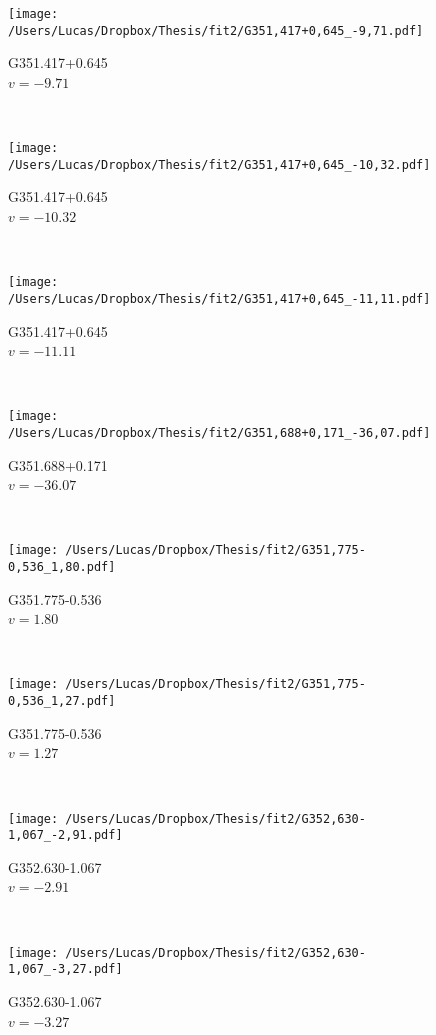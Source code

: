 \begin{figure*}[t]\ContinuedFloat
	\centering
	\begin{subfigure}[t]{0.3\textwidth}
		\texttt{[image: /Users/Lucas/Dropbox/Thesis/fit2/G351,417+0,645\_-9,71.pdf]}
		\caption[]{G351.417+0.645\\$v=-9.71$\,\kms}
	\end{subfigure}
	~
	\begin{subfigure}[t]{0.3\textwidth}
		\texttt{[image: /Users/Lucas/Dropbox/Thesis/fit2/G351,417+0,645\_-10,32.pdf]}
		\caption[]{G351.417+0.645\\$v=-10.32$\,\kms}
	\end{subfigure}
	~
	\begin{subfigure}[t]{0.3\textwidth}
		\texttt{[image: /Users/Lucas/Dropbox/Thesis/fit2/G351,417+0,645\_-11,11.pdf]}
		\caption[]{G351.417+0.645\\$v=-11.11$\,\kms}
	\end{subfigure}
	~
	\begin{subfigure}[t]{0.3\textwidth}
		\texttt{[image: /Users/Lucas/Dropbox/Thesis/fit2/G351,688+0,171\_-36,07.pdf]}
		\caption[]{G351.688+0.171\\$v=-36.07$\,\kms}
	\end{subfigure}
	~
	\begin{subfigure}[t]{0.3\textwidth}
		\texttt{[image: /Users/Lucas/Dropbox/Thesis/fit2/G351,775-0,536\_1,80.pdf]}
		\caption[]{G351.775-0.536\\$v=1.80$\,\kms}
	\end{subfigure}
	~
	\begin{subfigure}[t]{0.3\textwidth}
		\texttt{[image: /Users/Lucas/Dropbox/Thesis/fit2/G351,775-0,536\_1,27.pdf]}
		\caption[]{G351.775-0.536\\$v=1.27$\,\kms}
	\end{subfigure}
	~
	\begin{subfigure}[t]{0.3\textwidth}
		\texttt{[image: /Users/Lucas/Dropbox/Thesis/fit2/G352,630-1,067\_-2,91.pdf]}
		\caption[]{G352.630-1.067\\$v=-2.91$\,\kms}
	\end{subfigure}
	~
	\begin{subfigure}[t]{0.3\textwidth}
		\texttt{[image: /Users/Lucas/Dropbox/Thesis/fit2/G352,630-1,067\_-3,27.pdf]}
		\caption[]{G352.630-1.067\\$v=-3.27$\,\kms}

\end{subfigure}
\end{figure*}
